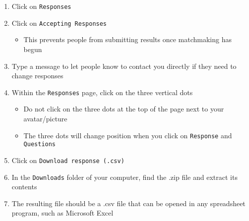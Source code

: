 \begin{enumerate}
	\item Click on \texttt{Responses}
	\item Click on \texttt{Accepting Responses}
		\begin{itemize}
			\item This prevents people from submitting results once matchmaking has begun
		\end{itemize}
	\item Type a message to let people know to contact you directly if they need to change responses
	\item Within the \texttt{Responses} page, click on the three vertical dots
		\begin{itemize}
			\item Do not click on the three dots at the top of the page next to your avatar/picture
			\item The three dots will change position when you click on \texttt{Response} and \texttt{Questions}
		\end{itemize}
	\item Click on \texttt{Download response (.csv)}
	\item In the \texttt{Downloads} folder of your computer, find the .zip file and extract its contents
	\item The resulting file should be a .csv file that can be opened in any spreadsheet program, such as Microsoft Excel
\end{enumerate}









































